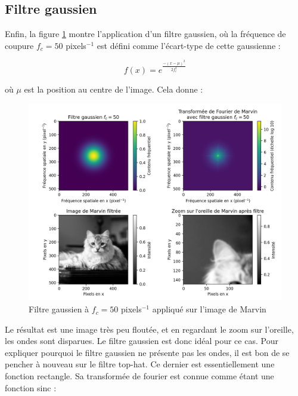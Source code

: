 \documentclass[11pt,letterpaper]{article}
\begin{document}
\subsection{Filtre gaussien}

Enfin, la figure \ref{gauss} montre l'application d'un filtre gaussien, où la fréquence de coupure $f_c = 50$ pixels$^{-1}$ est défini comme l'écart-type de cette gaussienne :

\begin{equation}
  f(x) = e^{\frac{-\left( x-\mu \right)^{2}}{2f_c^2}}
\end{equation}

où $\mu$ est la position au centre de l'image. Cela donne :

\begin{figure}[H]
  \centering
  \includegraphics[scale=0.7]{marvin_gauss_fc_50.png}
  \caption{Filtre gaussien à $f_c = 50$ pixels$^{-1}$ appliqué sur l'image de Marvin}
  \label{gauss}
\end{figure}

Le résultat est une image très peu floutée, et en regardant le zoom sur l'oreille, les ondes sont disparues. Le filtre gaussien est donc idéal pour ce cas. Pour expliquer pourquoi le filtre gaussien ne présente pas les ondes, il est bon de se pencher à nouveau sur le filtre top-hat. Ce dernier est essentiellement une fonction rectangle. Sa transformée de fourier est connue comme étant une fonction sinc :
\end{document}
